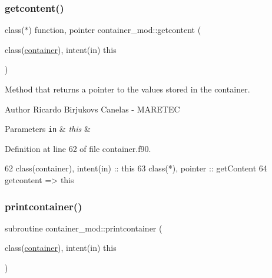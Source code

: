 \subsubsection{\texorpdfstring{getcontent()}{getcontent()}}
{\footnotesize\ttfamily class($\ast$) function, pointer container\+\_\+mod\+::getcontent (\begin{DoxyParamCaption}\item[{class(\mbox{\hyperlink{structcontainer__mod_1_1container}{container}}), intent(in)}]{this }\end{DoxyParamCaption})\hspace{0.3cm}{\ttfamily [private]}}



Method that returns a pointer to the values stored in the container. 

\begin{DoxyAuthor}{Author}
Ricardo Birjukovs Canelas -\/ M\+A\+R\+E\+T\+EC 
\end{DoxyAuthor}

\begin{DoxyParams}[1]{Parameters}
\mbox{\tt in}  & {\em this} & \\
\hline
\end{DoxyParams}


Definition at line 62 of file container.\+f90.


\begin{DoxyCode}
62     \textcolor{keywordtype}{class}(container), \textcolor{keywordtype}{intent(in)} :: this
63     \textcolor{keywordtype}{class}(*), \textcolor{keywordtype}{pointer} :: getContent
64     getcontent => this%
\end{DoxyCode}
\mbox{\label{namespacecontainer__mod_abf1785185971a527e437d3a489462724}} 
\subsubsection{\texorpdfstring{printcontainer()}{printcontainer()}}
{\footnotesize\ttfamily subroutine container\+\_\+mod\+::printcontainer (\begin{DoxyParamCaption}\item[{class(\mbox{\hyperlink{structcontainer__mod_1_1container}{container}}), intent(in)}]{this }\end{DoxyParamCaption})\hspace{0.3cm}{\ttfamily [private]}}



